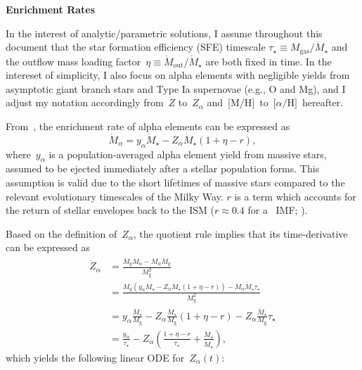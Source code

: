 \documentclass[12pt]{article}
\newcommand{\ah}{\ensuremath{\text{[$\alpha$/H]}}}
\newcommand{\mh}{\ensuremath{\text{[M/H]}}}
\begin{document}
\par\null\par\noindent
{\large \textbf{Enrichment Rates}}
\par\noindent
In the interest of analytic/parametric solutions, I assume throughout this
document that the star formation efficiency (SFE) timescale
$\tau_\star \equiv M_\text{gas} / \dot{M}_\star$ and the outflow mass loading
factor~$\eta \equiv \dot{M}_\text{out} / \dot{M}_\star$ are both fixed in time.
In the intereset of simplicity, I also focus on alpha elements with negligible
yields from asymptotic giant branch stars and Type Ia supernovae (e.g., O and
Mg), and I adjust my notation accordingly from~$Z$ to~$Z_\alpha$
and~\mh~to~\ah~hereafter.
\par
From~\citet*{Weinberg2017}, the enrichment rate of alpha elements can be
expressed as
\begin{equation}
\dot{M}_\alpha = y_\alpha \dot{M}_\star - Z_\alpha \dot{M}_\star (1 + \eta - r),
\label{eq:mdot_alpha}
\end{equation}
where~$y_\alpha$ is a population-averaged alpha element yield from massive
stars, assumed to be ejected immediately after a stellar population forms.
This assumption is valid due to the short lifetimes of massive stars compared
to the relevant evolutionary timescales of the Milky Way.
$r$ is a term which accounts for the return of stellar envelopes back to
the ISM ($r \approx 0.4$ for a~\citealt{Kroupa2001} IMF;
\citealp*{Weinberg2017}).
\par
Based on the definition of~$Z_\alpha$, the quotient rule implies that its
time-derivative can be expressed as
\begin{subequations}\begin{align}
\dot{Z}_\alpha &= \frac{
	M_\text{g} \dot{M}_\alpha - M_\alpha \dot{M}_\text{g}
}{
	M_\text{g}^2
}
\\
&= \frac{
	M_\text{g} (y_\alpha \dot{M}_\star - Z_\alpha \dot{M}_\star (1 + \eta - r))
	- M_\alpha \ddot{M}_\star \tau_\star
}{
	M_\text{g}^2
}
\\
&= y_\alpha \frac{\dot{M}_\star}{M_\text{g}} -
Z_\alpha \frac{\dot{M}_\star}{M_\text{g}}(1 + \eta - r) -
Z_\alpha \frac{\ddot{M}_\star}{M_\text{g}} \tau_\star
\\
&= \frac{y_\alpha}{\tau_\star} -
Z_\alpha \left(\frac{1 + \eta - r}{\tau_\star} +
\frac{\ddot{M}_\star}{\dot{M}_\star}\right),
\label{eq:dzdt}
\end{align}\end{subequations}
which yields the following linear ODE for~$Z_\alpha(t)$:
\end{document}
